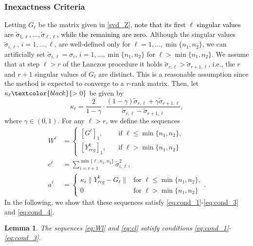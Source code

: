 \documentclass[pdflatex,sn-mathphys-num]{sn-jnl}
\numberwithin{equation}{section}%
\newcommand{\Yck}{{Y_{reg}^k}}
\newcommand{\cZ}{G}
\newcommand{\ML}{G}
\newcommand{\REV}[1]{\textcolor{black}{#1}}
\newcommand{\ste}[1]{\textcolor{black}{#1}}
\theoremstyle{thmstyleone}%
\newtheorem{lemma}[theorem]{Lemma}%
\theoremstyle{thmstyletwo}%
\theoremstyle{thmstylethree}%
\begin{document}
\subsubsection{Inexactness Criteria}
Letting  $ \ML_\ell$ be the matrix  given in \eqref{svd_Z}, \ste{note that its first $\ell$ singular values are $\tilde \sigma_{1,\ell}, \dots, \tilde \sigma_{\ell,\ell}$, while the remaining are zero.} {Although the singular values $\tilde{\sigma}_{i,\ell}$, $i=1,\ldots,\ell$, are well-defined only for $\ell=1,\ldots,\min\{n_1,n_2\}$, we can artificially set $\tilde\sigma_{i,\ell} = \sigma_i$, $i=1,\ldots,\min\{n_1,n_2\}$ for $\ell > \min\{n_1, n_2\}$. We} assume that at step $\ell>r$ of the Lanczos procedure it holds $\tilde\sigma_{r,\ell} > \tilde\sigma_{r+1,\ell} $, i.e., the $r$ and $r+1$ singular values of $\cZ_\ell$ are distinct. This is a reasonable assumption since the method is expected to converge to a $r$-rank matrix. Then, let $\kappa_\ell\REV{>0}$ be given by 
\begin{equation}
    \label{eq:const_A}
    \kappa_\ell = \frac{2}{1-\gamma} \cdot \frac{(1-\gamma)\tilde\sigma_{r,\ell}+\gamma\tilde\sigma_{r+1,\ell}}{\tilde\sigma_{r,\ell}-\tilde\sigma_{r+1,\ell}},
\end{equation}
where $\gamma \in (0,1)$. For any $\ell>r$, we define the sequences
\begin{align}
    W^{\ell}&=
    \begin{cases}
        [G^{\ell}]_1, \quad & \text{if } \ell\leq \min\{n_1,n_2\},\\
        [Y_{reg}^k]_1, \quad & \text{if } \ell>\min\{n_1,n_2\}
    \end{cases}\label{eq:Wl}\\
    c^\ell &= {\sum_{i=r+1}^{\min\{\ell, n_1, n_2\}} \tilde \sigma_{i,\ell}^2}, \label{eq:cl} \\
    a^\ell &= 
    \begin{cases}
        \kappa_\ell \| \Yck - \cZ_\ell \| &\text{for } \ell \leq \min\{n_1,n_2\}, \\
        0 &\text{for } \ell > \min\{n_1, n_2\}
    \end{cases}. \label{eq:al}
\end{align}
In the following, we show that these sequences satisfy \eqref{eq:cond_1}-\eqref{eq:cond_3} and \eqref{eq:cond_4}.
\begin{lemma}
    The sequences \eqref{eq:Wl} and \eqref{eq:cl} satisfy conditions \eqref{eq:cond_1}-\eqref{eq:cond_3}.
\end{lemma}
\end{document}
